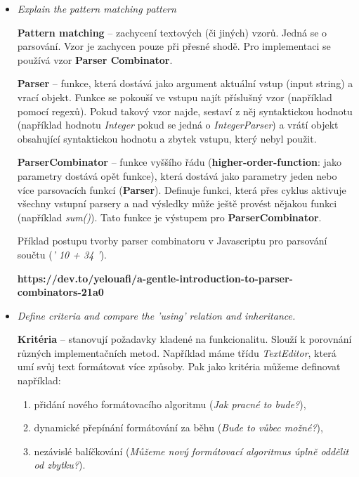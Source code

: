 \documentclass{szzclass}
\begin{document}
\begin{itemize}
      \item \textit{Explain the pattern matching pattern}
      
      \textbf{Pattern matching} -- zachycení textových (či jiných) vzorů. Jedná se o parsování. Vzor je
      zachycen pouze při přesné shodě. Pro implementaci se používá vzor \textbf{Parser Combinator}.

      \textbf{Parser} -- funkce, která dostává jako argument aktuální vstup (input string) a vrací objekt.
      Funkce se pokouší ve vstupu najít příslušný vzor (například pomocí regexů). Pokud takový vzor najde,
      sestaví z něj syntaktickou hodnotu (například hodnotu \textit{Integer} pokud se jedná o \textit{IntegerParser})
      a vrátí objekt obsahující syntaktickou hodnotu a zbytek vstupu, který nebyl použit.

      \textbf{ParserCombinator} -- funkce vyššího řádu (\textbf{higher-order-function}: jako parametry dostává opět
      funkce), která dostává jako parametry jeden nebo více parsovacích funkcí (\textbf{Parser}). 
      Definuje funkci, která přes cyklus aktivuje všechny vstupní parsery a nad výsledky může 
      ještě provést nějakou funkci (například \textit{sum()}). Tato funkce je výstupem pro 
      \textbf{ParserCombinator}.

      Příklad postupu tvorby parser combinatoru v Javascriptu pro parsování součtu (\textit{' 10 + 34  '}).

      \textbf{https://dev.to/yelouafi/a-gentle-introduction-to-parser-combinators-21a0}
      

      \item \textit{Define criteria and compare the 'using' relation and inheritance.}
      
      \textbf{Kritéria} -- stanovují požadavky kladené na funkcionalitu. Slouží k porovnání různých
      implementačních metod. Například máme třídu \textit{TextEditor}, která umí svůj text
      formátovat více způsoby. Pak jako kritéria můžeme definovat například:

      \begin{enumerate}
            \item přidání nového formátovacího algoritmu (\textit{Jak pracné to bude?}),
            \item dynamické přepínání formátování za běhu (\textit{Bude to vůbec možné?}),
            \item nezávislé balíčkování (\textit{Můžeme nový formátovací algoritmus úplně oddělit od zbytku?}).
      \end{enumerate}


\end{itemize}
\end{document}
